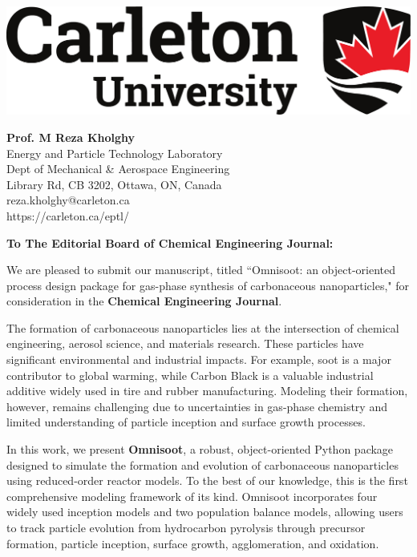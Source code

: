 \begin{titlepage}
	\pagestyle{empty} %
	\nolinenumbers
	\null\vspace{-1.0cm}
	\begin{minipage}[c]{0.5\textwidth}
		\includegraphics[width=\linewidth]{Figures/CarletonLogo/culogo.pdf}
	\end{minipage}
	\hspace{1cm} 
	\begin{minipage}[c]{0.5\textwidth}
		\raggedright
		\textbf{Prof. M Reza Kholghy}\\
		Energy and Particle Technology Laboratory\\
		Dept of Mechanical \& Aerospace Engineering\\
		Library Rd, CB 3202, Ottawa, ON, Canada\\
		reza.kholghy@carleton.ca\\
		https://carleton.ca/eptl/
	\end{minipage}
	\vspace{1cm}
	
	\noindent\textbf{To The Editorial Board of Chemical Engineering Journal:}
	\vspace{0.3cm}
	
	We are pleased to submit our manuscript, titled ``Omnisoot: an object-oriented process design package for gas-phase synthesis of carbonaceous nanoparticles," for consideration in the \textbf{Chemical Engineering Journal}.
	
	The formation of carbonaceous nanoparticles lies at the intersection of chemical engineering, aerosol science, and materials research. These particles have significant environmental and industrial impacts. For example, soot is a major contributor to global warming, while Carbon Black is a valuable industrial additive widely used in tire and rubber manufacturing. Modeling their formation, however, remains challenging due to uncertainties in gas-phase chemistry and limited understanding of particle inception and surface growth processes.
	
	In this work, we present \textbf{Omnisoot}, a robust, object-oriented Python package designed to simulate the formation and evolution of carbonaceous nanoparticles using reduced-order reactor models. To the best of our knowledge, this is the first comprehensive modeling framework of its kind. Omnisoot incorporates four widely used inception models and two population balance models, allowing users to track particle evolution from hydrocarbon pyrolysis through precursor formation, particle inception, surface growth, agglomeration, and oxidation. 
	

\end{titlepage}

